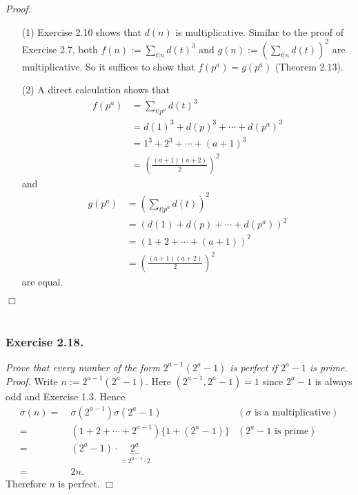 \documentclass{article}
\begin{document}
\emph{Proof.}
\begin{enumerate}
\item[(1)]
  Exercise 2.10 shows that $d(n)$ is multiplicative.
  Similar to the proof of Exercise 2.7,
  both $f(n) := \sum_{t|n} d(t)^3$ and $g(n) := \left(\sum_{t|n} d(t)\right)^2$
  are multiplicative.
  So it suffices to show that $f(p^a) = g(p^a)$ (Theorem 2.13).

\item[(2)]
  A direct calculation shows that
  \begin{align*}
    f(p^a)
    &= \sum_{t|p^a} d(t)^3 \\
    &= d(1)^3 + d(p)^3 + \cdots + d(p^a)^3 \\
    &= 1^3 + 2^3 + \cdots + (a+1)^3 \\
    &= \left( \frac{(a+1)(a+2)}{2} \right)^2
  \end{align*}
  and
  \begin{align*}
    g(p^a)
    &= \left( \sum_{t|p^a} d(t) \right)^2 \\
    &= (d(1) + d(p) + \cdots + d(p^a))^2 \\
    &= (1 + 2 + \cdots + (a+1))^2 \\
    &= \left( \frac{(a+1)(a+2)}{2} \right)^2
  \end{align*}
  are equal.
\end{enumerate}
$\Box$ \\\\






\subsubsection*{Exercise 2.18.}
\emph{Prove that every number of the form $2^{a-1}(2^a-1)$ is perfect
if $2^a-1$ is prime.} \\



\emph{Proof.}
  Write $n := 2^{a-1}(2^a-1)$.
  Here $(2^{a-1}, 2^a - 1) = 1$ since $2^a - 1$ is always odd and Exercise 1.3.
  Hence
  \begin{align*}
    \sigma(n)
    =& \: \sigma(2^{a-1}) \sigma(2^a-1)
      &(\text{$\sigma$ is a multiplicative}) \\
    =& \: (1 + 2 + \cdots + 2^{a-1})\{1 + (2^a-1)\}
      &(\text{$2^a - 1$ is prime}) \\
    =& \: (2^a - 1) \cdot \underbrace{2^a}_{= 2^{a-1} \cdot 2} \\
    =& \: 2n.
  \end{align*}
  Therefore $n$ is perfect.
$\Box$ \\\\
\end{document}
